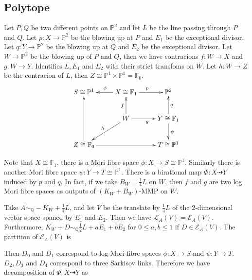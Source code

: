 \documentclass[11pt]{amsart}
\numberwithin{equation}{section}
\begin{document}
\subsection{Polytope}
Let  $P,Q$ be two different points on $\mathbb{P}^{2}$ and let $L$ be the line passing through $P$ and $Q$. Let $p:X\to \mathbb{P}^{2}$ be the blowing up at $P$ and $E_{1}$ be the exceptional divisor. Let $q:Y\to \mathbb{P}^{2}$ be the blowing up at $Q$ and $E_{2}$ be the exceptional divisor. Let $W\to \mathbb{P}^{2}$ be the blowing up of $P$ and $Q$, then we have contracions $f:W\to X$ and $g:W\to Y$. Identifies $L,E_{1}$ and $E_{2}$ with their strict transfoms on  $W$. Let $h:W\to Z$ be the contracion of $L$, then $Z\cong \mathbb{P}^{1} \times \mathbb{P}^{1}=\mathbb{F}_{0}$.
\[
  \xymatrix{
    S\cong \mathbb{P}^{1}&X\cong \mathbb{F}_{1}\ar[l]_{\phi}\ar[r]^{p} & \mathbb{P}^{2} \\
                         &W\ar[u]^{f}\ar[r]_{g}\ar[ld]_{h} & Y\cong \mathbb{F}_{1}\ar[u]_{q}\ar[d]^{\psi}\\
    Z\cong \mathbb{F}_{0}\ar[uu]\ar[rr]&&T\cong \mathbb{P}^{1}
  }
\]

Note that $X\cong \mathbb{F}_{1}$, there is a Mori fibre space $\phi:X\to S \cong \mathbb{P}^{1}$. Similarly there is another Mori fibre space $\psi:Y\to T\cong \mathbb{P}^{1}$. There is a birational map $\Phi:X\dashrightarrow  Y$ induced by $p$ and $q$. In fact, if we take $B_{W}=\frac{1}{4}L$ on $W$, then $f$ and $g$ are two log Mori fibre spaces as outputs of $(K_{W}+B_{W})$-MMP on $W$.

Take $A\sim_{\mathbb{Q}}-K_{W}+\frac{1}{4}L$, and let $V$ be the translate by  $\frac{1}{4}L$ of the 2-dimensional vector space spaned by $E_{1}$ and  $E_{2}$. Then we have $\mathcal{L}_{A}(V)=\mathcal{E}_{A}(V)$. Furthermore,  $K_{W}+D\sim_{\mathbb{Q}} \frac{1}{2}L+aE_{1}+bE_{2}$ for $0\leqslant a,b\leqslant 1$ if $D \in \mathcal{E}_{A}(V)$. The partition of $\mathcal{E}_{A}(V)$ is
\begin{center}
\end{center}
Then $D_{0}$ and $D_{1}$ correspond to log Mori fibre spaces $\phi:X\to S$ and $\psi:Y\to T$. $D_{2},D_{3}$ and $D_{4}$ correspond to three Sarkisov links. Therefore we have decomposition of $\Phi:X\dashrightarrow  Y$ as
\end{document}
